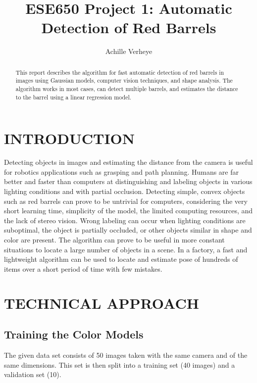 \documentclass[letterpaper, 10 pt, conference]{ieeeconf}  %
\title{\LARGE \bf
ESE650 Project 1: Automatic Detection of Red Barrels
}
\author{Achille Verheye%
}
\begin{document}
\maketitle
\thispagestyle{empty}
\pagestyle{empty}


\begin{abstract}

This report describes the algorithm for fast automatic detection of red barrels in images using Gaussian models, computer vision techniques, and shape analysis. The algorithm works in most cases, can detect multiple barrels, and estimates the distance to the barrel using a linear regression model.

\end{abstract}


\section{INTRODUCTION}

Detecting objects in images and estimating the distance from the camera is useful for robotics applications such as grasping and path planning. Humans are far better and faster than computers at distinguishing and labeling objects in various lighting conditions and with partial occlusion. Detecting simple, convex objects such as red barrels can prove to be untrivial for computers, considering the very short learning time, simplicity of the model, the limited computing resources, and the lack of stereo vision. Wrong labeling can occur when lighting conditions are suboptimal, the object is partially occluded, or other objects similar in shape and color are present. The algorithm can prove to be useful in more constant situations to locate a large number of objects in a scene. In a factory, a fast and lightweight algorithm can be used to locate and estimate pose of hundreds of items over a short period of time with few mistakes.

\section{TECHNICAL APPROACH}

\subsection{Training the Color Models}
The given data set consists of 50 images taken with the same camera and of the same dimensions. This set is then split into a training set (40 images) and a validation set (10).
\end{document}
